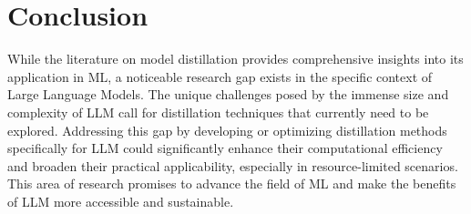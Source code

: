 \section*{Conclusion}

While the literature on model distillation provides comprehensive insights into its application in ML, a noticeable research gap exists in the specific context of Large Language Models. The unique challenges posed by the immense size and complexity of LLM call for distillation techniques that currently need to be explored. Addressing this gap by developing or optimizing distillation methods specifically for LLM could significantly enhance their computational efficiency and broaden their practical applicability, especially in resource-limited scenarios. This area of research promises to advance the field of ML and make the benefits of LLM more accessible and sustainable.
